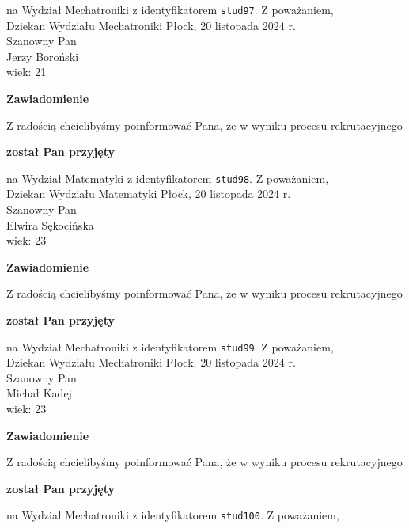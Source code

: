 \documentclass[12pt,a4paper]{article}
\begin{document}
na Wydział Mechatroniki z identyfikatorem \verb|stud97|. 
\vspace{2cm}
\noindent
Z poważaniem,\\
Dziekan
Wydziału Mechatroniki
\newpage
\hfill Płock, 20 listopada 2024 r.\\
\noindent 
Szanowny Pan \\
Jerzy Boroński \\
wiek: 21
\bigskip
\begin{center}
 	{\Large\textbf{Zawiadomienie}}
\end{center}
\bigskip
Z radością chcielibyśmy poinformować Pana, że w wyniku procesu rekrutacyjnego 
\begin{center}
\textsf{\textbf{został Pan przyjęty}} 
\end{center}
na Wydział Matematyki z identyfikatorem \verb|stud98|. 
\vspace{2cm}
\noindent
Z poważaniem,\\
Dziekan
Wydziału Matematyki
\newpage
\hfill Płock, 20 listopada 2024 r.\\
\noindent 
Szanowny Pan \\
Elwira Sękocińska \\
wiek: 23
\bigskip
\begin{center}
 	{\Large\textbf{Zawiadomienie}}
\end{center}
\bigskip
Z radością chcielibyśmy poinformować Pana, że w wyniku procesu rekrutacyjnego 
\begin{center}
\textsf{\textbf{został Pan przyjęty}} 
\end{center}
na Wydział Mechatroniki z identyfikatorem \verb|stud99|. 
\vspace{2cm}
\noindent
Z poważaniem,\\
Dziekan
Wydziału Mechatroniki
\newpage
\hfill Płock, 20 listopada 2024 r.\\
\noindent 
Szanowny Pan \\
Michał Kadej \\
wiek: 23
\bigskip
\begin{center}
 	{\Large\textbf{Zawiadomienie}}
\end{center}
\bigskip
Z radością chcielibyśmy poinformować Pana, że w wyniku procesu rekrutacyjnego 
\begin{center}
\textsf{\textbf{został Pan przyjęty}} 
\end{center}
na Wydział Mechatroniki z identyfikatorem \verb|stud100|. 
\vspace{2cm}
\noindent
Z poważaniem,\\
\end{document}
